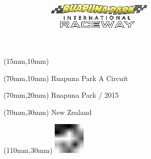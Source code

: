 \null\newpage
\begin{textblock*}{50mm}(15mm,10mm)%
\includegraphics[width=50mm]{LG/RUA.png}
\end{textblock*}
\begin{textblock*}{130mm}(70mm,10mm)%
{\fontsize{20}{20}\selectfont Ruapuna Park A Circuit}\\
\end{textblock*}
\begin{textblock*}{120mm}(70mm,20mm)%
{\fontsize{16}{16}\selectfont Ruapuna Park / 2015}\\
\end{textblock*}
\begin{textblock*}{120mm}(70mm,30mm)%
{\fontsize{12}{12}\selectfont New Zealand}
\end{textblock*}
\begin{textblock*}{30mm}(110mm,30mm)%
\centering
\includegraphics[height=15mm]{icons/fa-rotate-left.pdf}
\end{textblock*}
